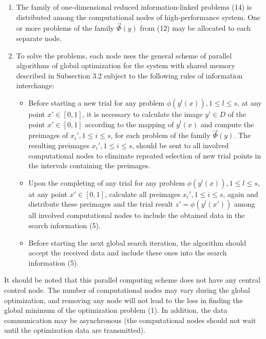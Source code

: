 \documentclass[
11pt,%
tightenlines,%
twoside,%
onecolumn,%
nofloats,%
nobibnotes,%
nofootinbib,%
superscriptaddress,%
noshowpacs,%
centertags]%
{revtex4}
\begin{document}
\begin{enumerate}
\item The family of one-dimensional reduced information-linked problems (14) is distributed among the computational nodes of high-performance system. One or more problems of the family $\overrightarrow{\Phi}(y)$ from (12) may be allocated to each separate node.

\item To solve the problems, each node uses the general scheme of parallel algorithms of global optimization for the system with shared memory described in Subsection 3.2 subject to the following rules of information interchange:

\begin{itemize}
\item Before starting a new trial for any problem $\phi(y^l(x)), 1 \leq l \leq s$, at any point $x' \in [0,1]$, it is necessary to calculate the image $y' \in D$ of the point $x' \in [0,1]$ according to the mapping of $y^l(x)$ and compute the preimages of $x_i', 1 \leq i \leq s$, for each problem of the family $\overrightarrow{\Phi}(y)$. The resulting preimages $x_i', 1 \leq i \leq s$, should be sent to all involved computational nodes to eliminate repeated selection of new trial points in the intervals containing the preimages.

\item Upon the completing of any trial for any problem $\phi(y^l(x)), 1 \leq l \leq s$, at any point $x' \in [0,1]$, calculate all preimages $x_i', 1 \leq i \leq s$, again and distribute these preimages and the trial result $z' = \phi(y^l(x'))$ among all involved computational nodes to include the obtained data in the search information (5).

\item Before starting the next global search iteration, the algorithm should accept the received data and include these ones into the search information (5).
\end{itemize}
\end{enumerate}

It should be noted that this parallel computing scheme does not have any central control node. The number of computational nodes may vary during the global optimization, and removing any node will not lead to the loss in finding the global minimum of the optimization problem (1). In addition, the data communication may be asynchronous (the computational nodes should not wait until the optimization data are transmitted).
\end{document}
